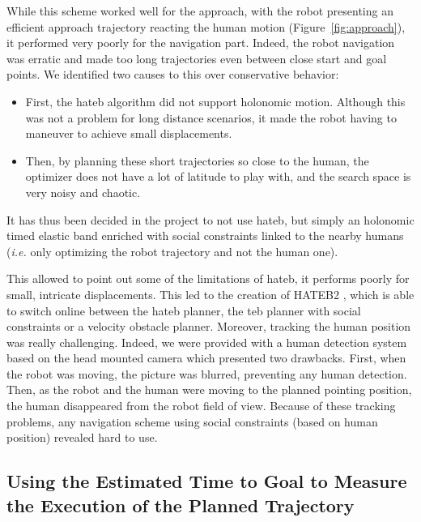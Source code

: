 \documentclass[a4paper,11pt,twoside]{StyleThese}
\begin{document}
While this scheme worked well for the approach, with the robot presenting an efficient approach trajectory reacting the human motion (Figure~\ref{fig:approach}), it performed very poorly for the navigation part. Indeed, the robot navigation was erratic and made too long trajectories even between close start and goal points. We identified two causes to this over conservative behavior:

\begin{itemize}
\item First, the \acrshort{hateb} algorithm did not support holonomic motion. Although this was not a problem for long distance scenarios, it made the robot having to maneuver to achieve small displacements.

\item Then, by planning these short trajectories so close to the human, the optimizer does not have a lot of latitude to play with, and the search space is very noisy and chaotic.
\end{itemize}

It has thus been decided in the project to not use \acrshort{hateb}, but simply an holonomic timed elastic band enriched with social constraints linked to the nearby humans (\textit{i.e.} only optimizing the robot trajectory and not the human one).

This allowed to point out some of the limitations of \acrshort{hateb}, it performs poorly for small, intricate displacements. This led to the creation of HATEB2 \cite{singamaneni2020hateb}, which is able to switch online between the \acrshort{hateb} planner, the \acrshort{teb} planner with social constraints or a velocity obstacle planner. Moreover, tracking the human position was really challenging. Indeed, we were provided with a human detection system based on the head mounted camera which presented two drawbacks. First, when the robot was moving, the picture was blurred, preventing any human detection. Then, as the robot and the human were moving to the planned pointing position, the human disappeared from the robot field of view. Because of these tracking problems, any navigation scheme using social constraints (based on human position) revealed hard to use.

\subsection{Using the Estimated Time to Goal to Measure the Execution of the Planned Trajectory}
\end{document}
